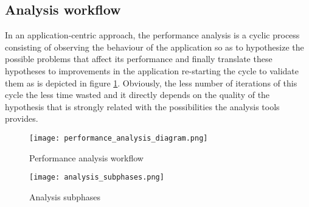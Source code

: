 \subsection{Analysis workflow}

In an application-centric
approach, the performance analysis is a cyclic process consisting of observing 
the behaviour of the application so as to hypothesize the possible problems 
that affect its performance and finally translate these hypotheses to 
improvements in the application re-starting the cycle to validate them as is
depicted in figure \ref{fig:perf_analysis_workflow}.
Obviously, the less number of iterations of this cycle the less time wasted and it directly depends on the quality of the hypothesis that is strongly related with the possibilities the analysis tools provides.

\begin{figure}[]
  \centering
  \texttt{[image: performance\_analysis\_diagram.png]}
  \caption{Performance analysis workflow}
  \label{fig:perf_analysis_workflow}
\end{figure}

\begin{figure}[]
  \centering
  \texttt{[image: analysis\_subphases.png]}
  \caption{Analysis subphases}
  \label{fig:analysis_subphases}
\end{figure}

